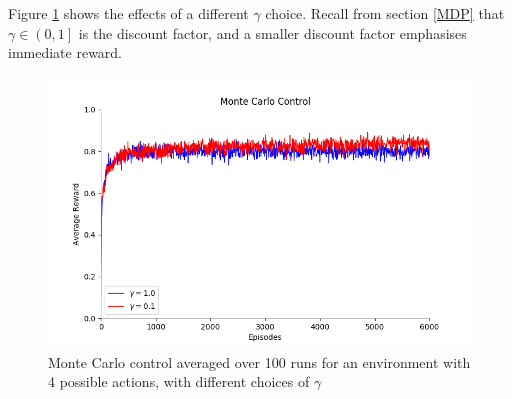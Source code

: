 Figure \ref{fig:diffgammas} shows the effects of a different $\gamma$ choice. Recall from section \ref{MDP} that $\gamma\in\left(0,1\right]$ is the discount factor, and a smaller discount factor emphasises immediate reward.
\begin{figure}[h]
\centering
\includegraphics[width=.85\textwidth]{resultsbasic/differentgammas}
\caption[Monte Carlo Control]{Monte Carlo control averaged over 100 runs for an environment with 4 possible actions, with different choices of $\gamma$}
\label{fig:diffgammas}
\end{figure}

